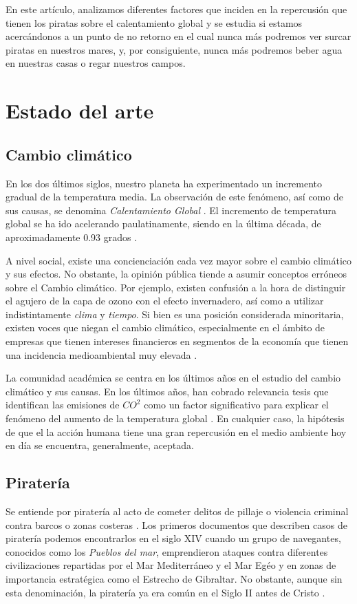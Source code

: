 \documentclass{article}
\begin{document}
En este artículo, analizamos diferentes factores que inciden en la repercusión que tienen los piratas sobre el calentamiento global y se estudia si estamos acercándonos a un punto de no retorno en el cual nunca más podremos ver surcar piratas en nuestros mares, y, por consiguiente, nunca más podremos beber agua en nuestras casas o regar nuestros campos.


\section{Estado del arte}
\subsection{Cambio climático}

En los dos últimos siglos, nuestro planeta ha experimentado un incremento gradual de la temperatura media. La observación de este fenómeno, así como de sus causas, se denomina \emph{Calentamiento Global}  \cite{mann_selin_2019, rahayuglobal}. El incremento de temperatura global se ha ido acelerando paulatinamente, siendo en la última década, de aproximadamente 0.93 grados \cite{alen}. 

A nivel social, existe una concienciación cada vez mayor sobre el cambio climático y sus efectos. No obstante, la opinión pública tiende a asumir conceptos erróneos sobre el Cambio climático. Por ejemplo, existen confusión a la hora de distinguir el agujero de la capa de ozono con el efecto invernadero, así como a utilizar indistintamente \emph{clima} y \emph{tiempo}\cite{bostrom}. Si bien es una posición considerada minoritaria, existen voces que niegan el cambio climático, especialmente en el ámbito de empresas que tienen intereses financieros en segmentos de la economía que tienen una incidencia medioambiental muy elevada \cite{astroturf}.

La comunidad académica se centra en los últimos años en el estudio del cambio climático y sus causas. En los últimos años, han cobrado relevancia tesis que identifican las emisiones de $CO^2$ como un factor significativo para explicar el fenómeno del aumento de la temperatura global \cite{whitmarsh2011}. En cualquier caso, la hipótesis de que el la acción humana tiene una gran repercusión en el medio ambiente hoy en día se encuentra, generalmente, aceptada.

\subsection{Piratería}
Se entiende por piratería al acto de cometer delitos de pillaje o violencia criminal contra barcos o zonas costeras \cite{pennell_2001}. Los primeros documentos que describen casos de piratería podemos encontrarlos en el siglo XIV cuando un grupo de navegantes, conocidos como los \emph{Pueblos del mar}, emprendieron ataques contra diferentes civilizaciones repartidas por el Mar Mediterráneo y el Mar Egéo y en zonas de importancia estratégica como el Estrecho de Gibraltar. No obstante, aunque sin esta denominación, la piratería ya era común en el Siglo II antes de Cristo \cite{lane2015}.
\end{document}
